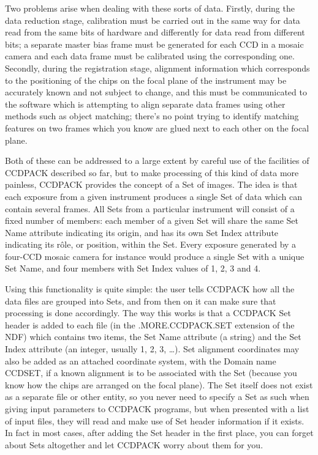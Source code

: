 \documentclass[twoside,11pt]{article}
\renewcommand{\_}{\texttt{\symbol{95}}}
\begin{document}
Two problems arise when dealing with these sorts of data.
Firstly, during the data reduction stage, calibration must be 
carried out in the same way for data read from the same bits of
hardware and differently for data read from different bits;
a separate master bias frame must be generated for each CCD in
a mosaic camera and each data frame must be calibrated using
the corresponding one.
Secondly, during the registration stage, alignment information
which corresponds to the positioning of the chips on the 
focal plane of the instrument may be accurately known and not
subject to change, and this must be communicated to the software
which is attempting to align separate data frames using
other methods such as object matching; there's no point trying
to identify matching features on 
two frames which you know are glued next to each
other on the focal plane.

Both of these can be addressed to a large extent by careful use of the
facilities of CCDPACK described so far, 
but to make processing of this kind of
data more painless, CCDPACK provides the concept of a Set of images.  
The idea is that each exposure from a given instrument produces
a single Set of data which can contain several frames.
All Sets from a particular instrument will 
consist of a fixed number of members:
each member of a given Set will share the same Set Name attribute
indicating its origin, 
and has its own Set Index attribute 
indicating its r\^{o}le, or position, within the Set.
Every exposure generated by a four-CCD mosaic camera for instance would
produce a single Set with a unique Set Name, 
and four members with Set Index values of 1, 2, 3 and 4.

Using this functionality is quite simple: the user tells CCDPACK
how all the data files are grouped into Sets, and from then on
it can make sure that processing is done accordingly.
The way this works is that
a CCDPACK Set header is added to each file
(in the .MORE.CCDPACK.SET extension of the NDF) which contains
two items, the Set Name attribute (a string) and the Set Index
attribute (an integer, usually 1, 2, 3, \ldots).  Set alignment coordinates
may also be added as an attached coordinate system,
with the Domain name CCD\_SET,
if a known alignment is to be associated with the Set
(because you know how the chips are arranged on the focal plane).
The Set itself does not exist as a separate file or other entity,
so you never need to specify a Set as such when giving input
parameters to CCDPACK programs, but when presented with a list
of input files, they will read and make use of Set header information
if it exists.  In fact in most cases, after adding the Set header
in the first place, you can forget about Sets altogether and let
CCDPACK worry about them for you.
\end{document}
